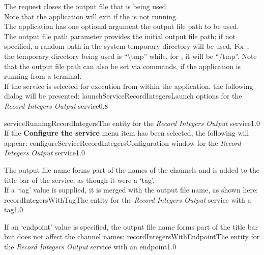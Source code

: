 The  request closes the output
file that is being used.\\

Note that the application will exit if the  is not
running.\\

The application has one optional argument \longDash{} the output file path to be used.
\insertAppParameters
{}
\insertOutputServiceComment\\

The output file path parameter provides the initial output file path; if not specified, a
random path in the system temporary directory will be used.
For \win, the temporary directory being used is ``\textbackslash{}tmp'' while, for \osx{},
it will be ``/tmp''.
Note that the output file path can also be set via commands, if the application is
running from a terminal.\\

\insertStandardServiceCommands
\condPage{}
If the service is selected for execution from within the \emph{\MMMU} application, the
following dialog will be presented:
%
{launchServiceRecordIntegers}{Launch options for the \emph{Record Integers Output}
service}{0.8}

%
{serviceRunningRecordIntegers}{The \emph{\MMMU} entity for the \emph{Record Integers
Output} service}{1.0}
\condPage{}
If the \textbf{Configure the service} menu item has been selected, the following will
appear:
%
{configureServiceRecordIntegers}{Configuration window for the \emph{Record Integers
Output} service}{1.0}

The output file name forms part of the names of the channels and is added to the title bar
of the service, as though it were a `tag'.\\

If a `tag' value is supplied, it is merged with the output file name, as shown here:
%
{recordIntegersWithTag}{The \emph{\MMMU} entity for the \emph{Record Integers Output}
service with a tag}{1.0}

If an `endpoint' value is specified, the output file name forms part of the title bar but
does not affect the channel names:
%
{recordIntegersWithEndpoint}{The \emph{\MMMU} entity for the \emph{Record Integers Output}
service with an endpoint}{1.0}

